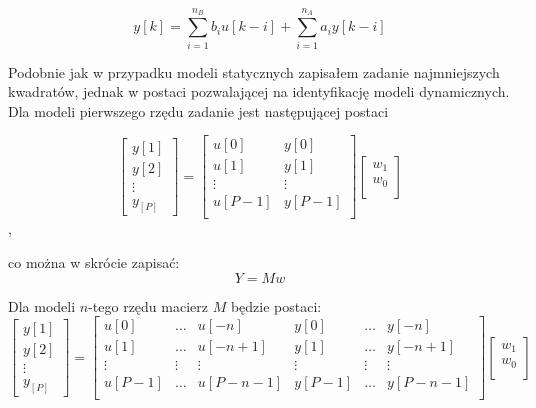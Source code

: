 \documentclass[a4paper,titlepage,11pt,floatssmall]{mwrep}
\begin{document}
\begin{equation*}
y[k] = \sum_{i=1}^{n_B} b_i u[k-i] + \sum_{i=1}^{n_A} a_i y[k-i]
\end{equation*}

Podobnie jak w przypadku modeli statycznych zapisałem zadanie najmniejszych kwadratów, jednak w postaci pozwalającej na identyfikację modeli dynamicznych. Dla modeli pierwszego rzędu zadanie jest następującej postaci

$$
\left[\begin{array}{c}
y[1] \\
y[2] \\
\vdots \\
y_[P]
\end{array} \right] 
=
\left[ \begin{array}{cc}
u[0] & y[0]  \\
u[1] & y[1] \\
\vdots & \vdots \\
u[P-1] & y[P-1]\\
\end{array} \right]
\left[\begin{array}{c}
w_1 \\
w_0 \\
\end{array} \right]
$$,

co można w skrócie zapisać:
\begin{equation*}
Y = Mw
\end{equation*}

Dla modeli $n$-tego rzędu macierz $M$ będzie postaci:
$$
\left[\begin{array}{c}
y[1] \\
y[2] \\
\vdots \\
y_[P]
\end{array} \right] 
=
\left[ \begin{array}{cccccc}
u[0] & \hdots & u[-n] & y[0] & \hdots & y[-n] \\
u[1] & \hdots & u[-n+1] & y[1] & \hdots & y[-n+1] \\
\vdots & \vdots & \vdots & \vdots & \vdots & \vdots \\
u[P-1] & \hdots & u[P-n-1] & y[P-1] & \hdots & y[P-n-1] \\
\end{array} \right]
\left[\begin{array}{c}
w_1 \\
w_0 \\
\end{array} \right]
$$
\end{document}
